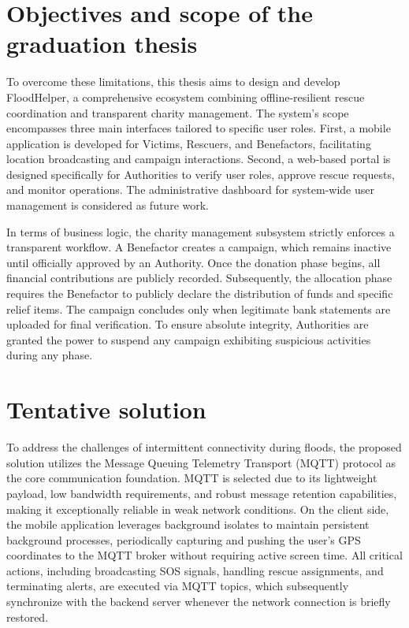 \documentclass[../Main.tex]{subfiles}
\begin{document}
\section{Objectives and scope of the graduation thesis}
\label{section:1.2}

To overcome these limitations, this thesis aims to design and develop FloodHelper, a comprehensive ecosystem combining offline-resilient rescue coordination and transparent charity management. The system's scope encompasses three main interfaces tailored to specific user roles. First, a mobile application is developed for Victims, Rescuers, and Benefactors, facilitating location broadcasting and campaign interactions. Second, a web-based portal is designed specifically for Authorities to verify user roles, approve rescue requests, and monitor operations. The administrative dashboard for system-wide user management is considered as future work.

In terms of business logic, the charity management subsystem strictly enforces a transparent workflow. A Benefactor creates a campaign, which remains inactive until officially approved by an Authority. Once the donation phase begins, all financial contributions are publicly recorded. Subsequently, the allocation phase requires the Benefactor to publicly declare the distribution of funds and specific relief items. The campaign concludes only when legitimate bank statements are uploaded for final verification. To ensure absolute integrity, Authorities are granted the power to suspend any campaign exhibiting suspicious activities during any phase.

\section{Tentative solution}
\label{section:1.3}

To address the challenges of intermittent connectivity during floods, the proposed solution utilizes the Message Queuing Telemetry Transport (MQTT) protocol as the core communication foundation. MQTT is selected due to its lightweight payload, low bandwidth requirements, and robust message retention capabilities, making it exceptionally reliable in weak network conditions. On the client side, the mobile application leverages background isolates to maintain persistent background processes, periodically capturing and pushing the user's GPS coordinates to the MQTT broker without requiring active screen time. All critical actions, including broadcasting SOS signals, handling rescue assignments, and terminating alerts, are executed via MQTT topics, which subsequently synchronize with the backend server whenever the network connection is briefly restored.
\end{document}
